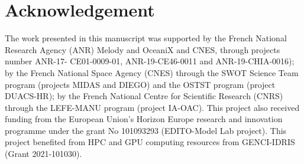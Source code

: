 \chapter*{Acknowledgement}


The work presented in this manuscript was supported by the French National Research Agency (ANR) Melody and OceaniX and CNES, through projects number ANR-17- CE01-0009-01, ANR-19-CE46-0011 and ANR-19-CHIA-0016); by the French National Space Agency (CNES) through the SWOT Science Team program (projects MIDAS and DIEGO) and the OSTST program (project DUACS-HR); by the French National Centre for Scientific Research (CNRS) through the LEFE-MANU program (project IA-OAC). This project also received funding from the European Union’s Horizon Europe research and innovation programme under the grant No 101093293 (EDITO-Model Lab project). This project benefited from HPC and GPU computing resources from GENCI-IDRIS (Grant 2021-101030).
